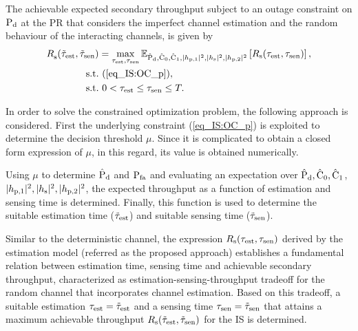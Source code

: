 \begin{theorem} \label{th_IS:th4}
\normalfont
The achievable expected secondary throughput subject to an outage constraint on $\text{P}_{\text{d}}$ at the PR that considers the imperfect channel estimation and the random behaviour of the interacting channels, is given by
\begin{align}
{R}_{\text{s}}^{\text{}}(\tilde{\tau}_{\text{est}}, \tilde{\tau}_{\text{sen}}) &= \operatorname*{max}_{\tau_{\text{est}}, \tau_{\text{sen}}} {\mathbb E}_{\hat{\text{P}}_{\text{d}}, \hat{\text{C}}_{\text{0}}, \hat{\text{C}}_{\text{1}}, |h_{\text{p,1}}|^2, |h_{\text{s}}|^2, |h_{\text{p,2}}|^2}\left[ R_{\text{s}}(\tau_{\text{est}}, \tau_{\text{sen}}) \right], \nonumber \\ 
\text{s.t.} & \text{ }  (\ref{eq_IS:OC_p}),  \\
\text{s.t.} & \text{ }  0 < \tau_{\text{est}} \le \tau_{\text{sen}} \le T. \nonumber
\end{align}
\end{theorem}

\begin{IEEEproof}[Solution]
In order to solve the constrained optimization problem, the following approach is considered. First the underlying constraint (\ref{eq_IS:OC_p}) is exploited to determine the decision threshold $\mu$. Since it is complicated to obtain a closed form expression of $\mu$, in this regard, its value is obtained numerically.

Using $\mu$ to determine $\hat{\text{P}}_{\text{d}}$ and $\text{P}_{\text{fa}}$ and evaluating an expectation over $\hat{\text{P}}_{\text{d}}, \hat{\text{C}}_{\text{0}}, \hat{\text{C}}_{\text{1}}$, $|h_{\text{p,1}}|^2, |h_{\text{s}}|^2, |h_{\text{p,2}}|^2$, the expected throughput as a function of estimation and sensing time is determined. Finally, this function is used to determine the suitable estimation time ($\tilde{\tau}_{\text{est}}$) and suitable sensing time ($\tilde{\tau}_{\text{sen}}$).
\end{IEEEproof}


\begin{remark} \label{rem_IS:rem4}
\normalfont
Similar to the deterministic channel, the expression $R_{\text{s}}(\tau_{\text{est}}, \tau_{\text{sen}})$ derived by the estimation model (referred as the proposed approach) establishes a fundamental relation between estimation time, sensing time and achievable secondary throughput, characterized as estimation-sensing-throughput tradeoff for the random channel that incorporates channel estimation. Based on this tradeoff, a suitable estimation $\tau_{\text{est}} = \tilde{\tau}_{\text{est}}$ and a sensing time $\tau_{\text{sen}} = \tilde{\tau}_{\text{sen}}$ that attains a maximum achievable throughput $R_{\text{s}}(\tilde{\tau}_{\text{est}},\tilde{\tau}_{\text{sen}})$ for the IS is determined.
\end{remark}


